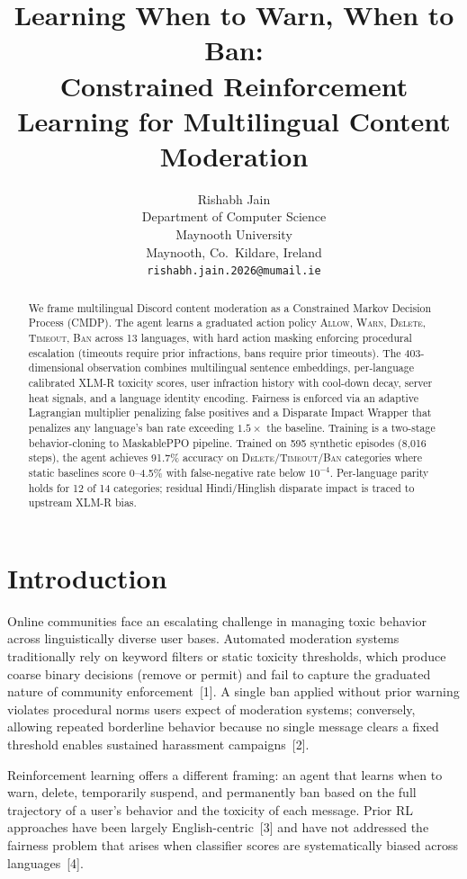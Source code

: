 \documentclass{article}
\title{Learning When to Warn, When to Ban:\\Constrained Reinforcement Learning for Multilingual Content Moderation}
\author{%
  Rishabh Jain \\
  Department of Computer Science \\
  Maynooth University \\
  Maynooth, Co.\ Kildare, Ireland \\
  \texttt{rishabh.jain.2026@mumail.ie}
}
\begin{document}
\maketitle


\begin{abstract}
We frame multilingual Discord content moderation as a Constrained Markov Decision
Process (CMDP). The agent learns a graduated action policy \textsc{Allow},
\textsc{Warn}, \textsc{Delete}, \textsc{Timeout}, \textsc{Ban} across 13
languages, with hard action masking enforcing procedural escalation (timeouts
require prior infractions, bans require prior timeouts). The 403-dimensional
observation combines multilingual sentence embeddings, per-language calibrated
XLM-R toxicity scores, user infraction history with cool-down decay, server heat
signals, and a language identity encoding. Fairness is enforced via an adaptive
Lagrangian multiplier penalizing false positives and a Disparate Impact Wrapper
that penalizes any language's ban rate exceeding $1.5\times$ the baseline.
Training is a two-stage behavior-cloning to MaskablePPO pipeline. Trained on
595 synthetic episodes (8,016 steps), the agent achieves 91.7\% accuracy on
\textsc{Delete}/\textsc{Timeout}/\textsc{Ban} categories where static
baselines score 0--4.5\% with false-negative rate below $10^{-4}$. Per-language
parity holds for 12 of 14 categories; residual Hindi/Hinglish disparate impact
is traced to upstream XLM-R bias.
\end{abstract}


\section{Introduction}

Online communities face an escalating challenge in managing toxic behavior across
linguistically diverse user bases. Automated moderation systems traditionally
rely on keyword filters or static toxicity thresholds, which produce coarse
binary decisions (remove or permit) and fail to capture the graduated nature of
community enforcement~[1]. A single ban applied without prior warning violates
procedural norms users expect of moderation systems; conversely, allowing
repeated borderline behavior because no single message clears a fixed threshold
enables sustained harassment campaigns~[2].

Reinforcement learning offers a different framing: an agent that learns when to
warn, delete, temporarily suspend, and permanently ban based on the full
trajectory of a user's behavior and the toxicity of each message. Prior RL
approaches have been largely English-centric~[3] and have not addressed the
fairness problem that arises when classifier scores are systematically biased
across languages~[4].
\end{document}
